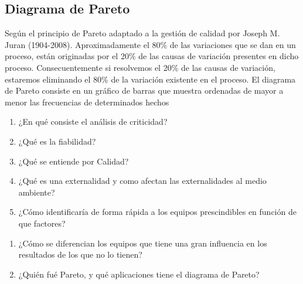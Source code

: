 \documentclass[../main]{subfiles}
\begin{document}
 


\subsection{Diagrama de Pareto}
Según el principio de Pareto adaptado a la gestión de
calidad por Joseph M. Juran (1904-2008).
Aproximadamente el 80\% de las variaciones que se dan en
un proceso, están originadas por el 20\% de las causas de variación presentes en dicho proceso.
Consecuentemente si resolvemos el 20\% de las causas de
variación, estaremos eliminando el 80\% de la variación
existente en el proceso. El diagrama de Pareto consiste en un gráfico de barras que muestra ordenadas de mayor a
menor las frecuencias de determinados hechos


\newpage
{}
\begin{enumerate}
    \item ¿En qué consiste el análisis de criticidad?
    \item ¿Qué es la fiabilidad?
    \item ¿Qué se entiende por Calidad?
    \item ¿Qué es una externalidad y como afectan las externalidades al medio ambiente?
    \item ¿Cómo identificaría de forma rápida a los equipos prescindibles en función de que factores?
\end{enumerate}

\begin{enumerate}
    \item ¿Cómo se diferencian los equipos que tiene una gran influencia en los resultados de los que no lo tienen? 
    \item ¿Quién fué Pareto, y qué aplicaciones tiene el diagrama de Pareto?
    
\end{enumerate}
\end{document}
